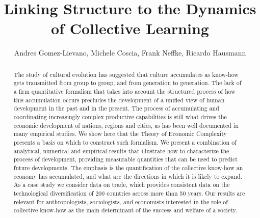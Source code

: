 \documentclass{pnastwo}
\begin{document}
\title{Linking Structure to the Dynamics of Collective Learning}


\author{Andres Gomez-Lievano, Michele Coscia, Frank Neffke, Ricardo Hausmann}



\maketitle

\begin{article}
\begin{abstract}
The study of cultural evolution has suggested that culture accumulates
as know-how gets transmitted from group to group, and from generation to
generation. The lack of a firm quantitative formalism that takes into
account the structured process of how this accumulation occurs precludes
the development of a unified view of human development in the past and
in the present. The process of accumulating and coordinating
increasingly complex productive capabilities is still what drives the
economic development of nations, regions and cities, as has been well
documented in many empirical studies. We show here that the Theory of
Economic Complexity presents a basis on which to construct such
formalism. We present a combination of analytical, numerical and
empirical results that illustrate how to characterize the process of
development, providing measurable quantities that can be used to predict
future developments. The emphasis is the quantification of the
collective know-how an economy has accumulated, and what are the
directions in which it is likely to expand. As a case study we consider
data on trade, which provides consistent data on the technological
diversification of 200 countries across more than 50 years. Our results
are relevant for anthropologists, sociologists, and economists
interested in the role of collective know-how as the main determinant of
the success and welfare of a society.%
\end{abstract}%








\end{article}
\end{document}

